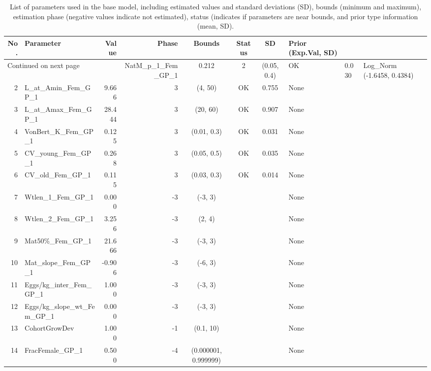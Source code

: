 \documentclass[12pt,]{article}
\begin{document}
\begin{landscape}

\begin{longtable}{rlrrcccp{1.5in}}
\caption{List of parameters used in
                                              the base model, including estimated 
                                              values and standard deviations (SD), 
                                              bounds (minimum and maximum), 
                                              estimation phase (negative values indicate
                                              not estimated), status (indicates if 
                                              parameters are near bounds, and prior type
                                              information (mean, SD).} \\ 
  \hline
No. & Parameter & Value & Phase & Bounds & Status & SD & Prior (Exp.Val, SD)  \\ 
  \hline 
\endhead 
\hline 
\multicolumn{3}{l}{\footnotesize Continued on next page} 
\endfoot 
\endlastfoot 
 \hline
1 & NatM\_p\_1\_Fem\_GP\_1 & 0.212 & 2 & (0.05, 0.4) & OK & 0.030 & Log\_Norm (-1.6458, 0.4384) \\ 
  2 & L\_at\_Amin\_Fem\_GP\_1 & 9.666 & 3 & (4, 50) & OK & 0.755 & None \\ 
  3 & L\_at\_Amax\_Fem\_GP\_1 & 28.444 & 3 & (20, 60) & OK & 0.907 & None \\ 
  4 & VonBert\_K\_Fem\_GP\_1 & 0.125 & 3 & (0.01, 0.3) & OK & 0.031 & None \\ 
  5 & CV\_young\_Fem\_GP\_1 & 0.268 & 3 & (0.05, 0.5) & OK & 0.035 & None \\ 
  6 & CV\_old\_Fem\_GP\_1 & 0.115 & 3 & (0.03, 0.3) & OK & 0.014 & None \\ 
  7 & Wtlen\_1\_Fem\_GP\_1 & 0.000 & -3 & (-3, 3) &  &  & None \\ 
  8 & Wtlen\_2\_Fem\_GP\_1 & 3.256 & -3 & (2, 4) &  &  & None \\ 
  9 & Mat50\%\_Fem\_GP\_1 & 21.666 & -3 & (-3, 3) &  &  & None \\ 
  10 & Mat\_slope\_Fem\_GP\_1 & -0.906 & -3 & (-6, 3) &  &  & None \\ 
  11 & Eggs/kg\_inter\_Fem\_GP\_1 & 1.000 & -3 & (-3, 3) &  &  & None \\ 
  12 & Eggs/kg\_slope\_wt\_Fem\_GP\_1 & 0.000 & -3 & (-3, 3) &  &  & None \\ 
  13 & CohortGrowDev & 1.000 & -1 & (0.1, 10) &  &  & None \\ 
  14 & FracFemale\_GP\_1 & 0.500 & -4 & (0.000001, 0.999999) &  &  & None \\ 

\end{longtable}
\end{landscape}
\end{document}
